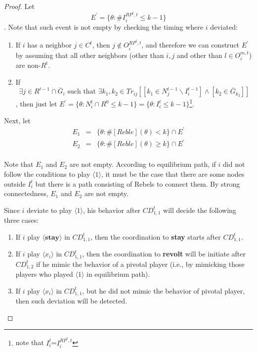 \documentclass[12pt,letter]{article}
\theoremstyle{definition}
\theoremstyle{remark}
\theoremstyle{claim}
\begin{document}
\begin{proof}


Let
\[E^{'}=\{\theta:\#I^{RP^t,t}_i\leq k-1\}\]
. Note that such event is not empty by checking the timing where $i$ deviated:
\begin{enumerate}
\item If $i$ has a neighbor $j\in C^t$, then $j\not\in O^{RP^t,t}_i$, and therefore we can construct $E^{'}$ by assuming that all other neighbors (other than $i,j$ and other than $l\in O^{m,t}_i$) are non-$R^t$.
\item If \[\exists j\in R^{t-1}\cap \bar{G}_i \text{ such that } \exists k_1,k_2\in Tr_{ij}[[k_1\in N^{t-1}_j\backslash I^{t-1}_i] \wedge [k_2\in \bar{G}_{k_2}]]\], then just let $E^{'}=\{\theta: N^t_i\cap R^0\leq k-1\}=\{\theta: I^t_i\leq k-1\}$\footnote{note that $I^t_i$=$I^{RP^t,t}_i$}.
\end{enumerate}

Next, let 
\begin{eqnarray*}
E_1&=&\{\theta: \#[Reble](\theta)<k\}\cap E^{'}\\
E_2&=&\{\theta: \#[Reble](\theta)\geq k\}\cap E^{'}\\
\end{eqnarray*}

Note that $E_1$ and $E_2$ are not empty. According to equilibrium path, if $i$ did not follow the conditions to play $\langle 1 \rangle$, it must be the case that there are some nodes outside $I^t_i$ but there is a path consisting of Rebels to connect them. By strong connectedness, $E_1$ and $E_2$ are not empty.

Since $i$ deviate to play $\langle 1 \rangle$, his behavior after $CD^t_{1,1}$ will decide the following three cases:
\begin{enumerate}
\item If $i$ play $\langle \textbf{stay} \rangle$ in $CD^t_{1,1}$, then the coordination to \textbf{stay} starts after $CD^t_{1,1}$.
\item If $i$ play $\langle x_i \rangle$ in $CD^t_{1,1}$, then the coordination to \textbf{revolt} will be initiate after $CD^t_{1,2}$ if he mimic the behavior of a pivotal player (i.e., by mimicking those players who played $\langle 1 \rangle$ in equilibrium path).
\item If $i$ play $\langle x_i \rangle$ in $CD^t_{1,1}$, but he did not mimic the behavior of pivotal player, then such deviation will be detected.
\end{enumerate}


\end{proof}
\end{document}
